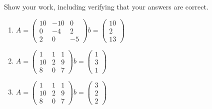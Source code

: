 \documentclass[conference,onecolumn]{IEEEtran}
\begin{document}
\begin{enumerate}[label=\arabic{enumi}.]
          Show your work, including verifying that your answers are correct.

          \begin{enumerate}
              \centering
              \item $A =
                        \begin{pmatrix}
                            10 & -10 & 0  \\
                            0  & -4  & 2  \\
                            2  & 0   & -5
                        \end{pmatrix}
                        b =
                        \begin{pmatrix}
                            10 \\
                            2  \\
                            13
                        \end{pmatrix}
                    $
              \item $A =
                        \begin{pmatrix}
                            1  & 1 & 1 \\
                            10 & 2 & 9 \\
                            8  & 0 & 7
                        \end{pmatrix}
                        b =
                        \begin{pmatrix}
                            1 \\
                            3 \\
                            1
                        \end{pmatrix}
                    $
              \item $A =
                        \begin{pmatrix}
                            1  & 1 & 1 \\
                            10 & 2 & 9 \\
                            8  & 0 & 7
                        \end{pmatrix}
                        b =
                        \begin{pmatrix}
                            3 \\
                            2 \\
                            2
                        \end{pmatrix}
                    $
          \end{enumerate}


\end{enumerate}
\end{document}
